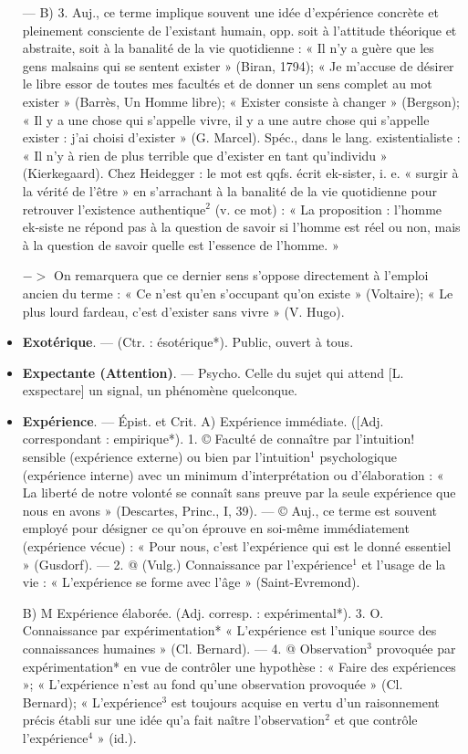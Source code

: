 \begin{itemize}[leftmargin=1cm, label=, itemsep=1pt]
— B) 3. Auj., ce terme implique
souvent une idée d’expérience concrète et pleinement consciente de
l'existant humain, opp. soit à l’attitude théorique et abstraite, soit à
la banalité de la vie quotidienne :
« Il n’y a guère que les gens malsains
qui se sentent exister » (Biran,
1794); « Je m’accuse de désirer le
libre essor de toutes mes facultés et
de donner un sens complet au mot
exister » (Barrès, Un Homme libre);
« Exister consiste à changer »
(Bergson); « Il y a une chose qui
s'appelle vivre, il y a une autre chose
qui s'appelle exister : j'ai choisi
d'exister » (G. Marcel). Spéc., dans
le lang. existentialiste : « Il n'y à
rien de plus terrible que d’exister
en tant qu'individu » (Kierkegaard).
Chez Heidegger : le mot est qqfs.
écrit ek-sister, i. e. « surgir à la vérité
de l'être » en s’arrachant à la banalité de la vie quotidienne pour
retrouver l'existence authentique$^2$ (v.
ce mot) : « La proposition : l’homme
ek-siste ne répond pas à la question
de savoir si l'homme est réel ou non,
mais à la question de savoir quelle
est l’essence de l’homme. »

$->$ On remarquera que ce dernier sens s'oppose directement à
l'emploi ancien du terme : « Ce n’est
qu'en s'occupant qu'on existe »
(Voltaire); « Le plus lourd fardeau,
c’est d'exister sans vivre » (V. Hugo).

\item {\bf Exotérique}. — (Ctr. : ésotérique*).
Public, ouvert à tous.

\item {\bf Expectante (Attention)}. — Psycho.
Celle du sujet qui attend [L. exspectare] un signal, un phénomène quelconque.

\item {\bf Expérience}. — Épist. et Crit. A) Expérience immédiate. ([Adj. correspondant : empirique*). 1. © Faculté
de connaître par l'intuition! sensible (expérience externe) ou bien
par l'intuition$^1$ psychologique (expérience interne) avec un minimum
d'interprétation ou d'élaboration :
« La liberté de notre volonté se
connaît sans preuve par la seule
expérience que nous en avons »
(Descartes, Princ., I, 39). — © Auj.,
ce terme est souvent employé pour
désigner ce qu’on éprouve en soi-même immédiatement (expérience
vécue) : « Pour nous, c’est l’expérience qui est le donné essentiel »
(Gusdorf). — 2. @ (Vulg.) Connaissance par l'expérience$^1$ et l'usage
de la vie : « L'expérience se forme
avec l’âge » (Saint-Evremond).

B) M Expérience élaborée. (Adj.
corresp. : expérimental*). 3. O. Connaissance par expérimentation*
« L'expérience est l'unique source
des connaissances humaines » (Cl.
Bernard). — 4. @ Observation$^3$ provoquée par expérimentation* en
vue de contrôler une hypothèse :
« Faire des expériences »; « L’expérience n’est au fond qu’une observation provoquée » (Cl. Bernard);
« L'expérience$^3$ est toujours acquise
en vertu d'un raisonnement précis
établi sur une idée qu’a fait naître
l'observation$^2$ et que contrôle l’expérience$^4$ » (id.).


\end{itemize}
